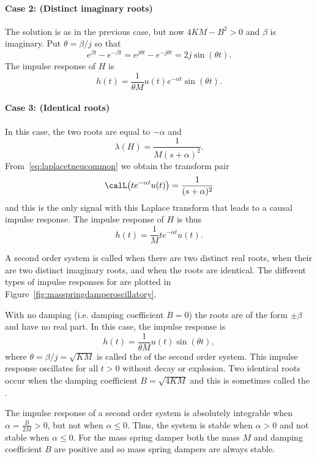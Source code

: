 \paragraph{Case 2: (Distinct imaginary roots)}
The solution is as in the previous case, but now $4KM - B^2 > 0$ and $\beta$ is imaginary.  Put $\theta = \beta/j$ so that
\[
e^{\beta t} - e^{-\beta t} = e^{j \theta t} - e^{-j \theta t} = 2 j \sin(\theta t).
\]
The impulse response of $H$ is
\[
h(t) = \frac{1}{ \theta M} u(t) e^{-\alpha t} \sin(\theta t).
\]

\paragraph{Case 3: (Identical roots)}
In this case, the two roots are equal to $-\alpha$ and
\[
\lambda(H) = \frac{1}{M(s + \alpha)^2}.
\]
From~\eqref{eq:laplacetneucommon} we obtain the transform pair
\[
\calL\big(t e^{-\alpha t} u(t)\big) = \frac{1}{(s + \alpha)^2}
\]
and this is the only signal with this Laplace transform that leads to a causal impulse response.  The impulse response of $H$ is thus
\[
h(t) = \frac{1}{M} t e^{-\alpha t} u(t).
\]

A second order system is called  when there are two distinct real roots,  when their are two distinct imaginary roots, and  when the roots are identical.  The different types of impulse responses for are plotted in Figure~\ref{fig:masspringdamperoscillatory}.

With no damping (i.e. damping coefficient $B = 0$) the roots are of the form $\pm \beta$ and have no real part.  In this case, the impulse response is
\[
h(t) = \frac{1}{ \theta M} u(t) \sin(\theta t),
\]
where $\theta = \beta/j = \sqrt{KM}$ is called the  of the second order system.  This impulse response oscillates for all $t > 0$ without decay or explosion.  Two identical roots occur when the damping coefficient $B = \sqrt{4KM}$ and this is sometimes called the .

The impulse response of a second order system is absolutely integrable when $\alpha =  \tfrac{B}{2M} > 0$, but not when $\alpha \leq 0$.  Thus, the system is stable when $\alpha > 0$ and not stable when $\alpha \leq 0$.   For the mass spring damper both the mass $M$ and damping coefficient $B$ are positive and so mass spring dampers are always stable.

